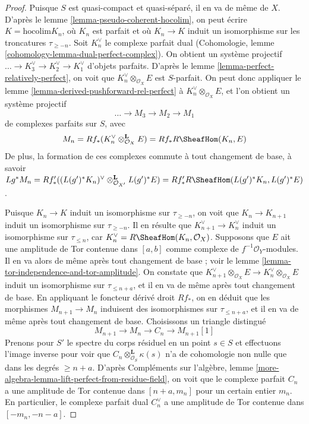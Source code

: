 \begin{proof}
Puisque $S$ est quasi-compact et quasi-séparé, il en va de même de $X$.
D'après le lemme \ref{lemma-pseudo-coherent-hocolim}, on peut écrire
$K = \text{hocolim} K_n$, où $K_n$ est parfait et où $K_n \to K$ induit
un isomorphisme sur les troncatures $\tau_{\geq -n}$. Soit $K_n^\vee$
le complexe parfait dual
(Cohomologie, lemme \ref{cohomology-lemma-dual-perfect-complex}).
On obtient un système projectif $\ldots \to K_3^\vee \to K_2^\vee \to K_1^\vee$
d'objets parfaits. D'après le lemme \ref{lemma-perfect-relatively-perfect},
on voit que $K_n^\vee \otimes_{\mathcal{O}_X} E$ est $S$-parfait.
On peut donc appliquer le lemme \ref{lemma-derived-pushforward-rel-perfect}
à $K_n^\vee \otimes_{\mathcal{O}_X} E$, et l'on obtient un système projectif
$$
\ldots \to M_3 \to M_2 \to M_1
$$
de complexes parfaits sur $S$, avec
$$
M_n = Rf_*(K_n^\vee \otimes_{\mathcal{O}_X}^\mathbf{L} E) =
Rf_*R\SheafHom(K_n, E)
$$
De plus, la formation de ces complexes commute à tout
changement de base, à savoir $Lg^*M_n =
Rf'_*((L(g')^*K_n)^\vee \otimes_{\mathcal{O}_{X'}}^\mathbf{L} L(g')^*E) =
Rf'_*R\SheafHom(L(g')^*K_n, L(g')^*E)$.

\medskip\noindent
Puisque $K_n \to K$ induit un isomorphisme sur $\tau_{\geq -n}$, on voit que
$K_n \to K_{n + 1}$ induit un isomorphisme sur $\tau_{\geq -n}$.
Il en résulte que $K_{n + 1}^\vee \to K_n^\vee$
induit un isomorphisme sur $\tau_{\leq n}$, car
$K_n^\vee = R\SheafHom(K_n, \mathcal{O}_X)$.
Supposons que $E$ ait une amplitude de Tor contenue dans $[a, b]$ comme complexe
de $f^{-1}\mathcal{O}_Y$-modules. Il en va alors de même après
tout changement de base ; voir le lemme \ref{lemma-tor-independence-and-tor-amplitude}.
On constate que
$K_{n + 1}^\vee \otimes_{\mathcal{O}_X} E \to
K_n^\vee \otimes_{\mathcal{O}_X} E$
induit un isomorphisme sur $\tau_{\leq n + a}$,
et il en va de même après tout changement de base.
En appliquant le foncteur dérivé droit $Rf_*$,
on en déduit que les morphismes $M_{n + 1} \to M_n$
induisent des isomorphismes sur $\tau_{\leq n + a}$,
et il en va de même après tout changement de base.
Choisissons un triangle distingué
$$
M_{n + 1} \to M_n \to C_n \to M_{n + 1}[1]
$$
Prenons pour $S'$ le spectre du corps résiduel en un point
$s \in S$ et effectuons l'image inverse pour voir que
$C_n \otimes_{\mathcal{O}_S}^\mathbf{L} \kappa(s)$
n'a de cohomologie non nulle que dans les degrés $\geq n + a$. D'après
Compléments sur l'algèbre, lemme
\ref{more-algebra-lemma-lift-perfect-from-residue-field},
on voit que le complexe parfait $C_n$ a une amplitude de Tor contenue dans
$[n + a, m_n]$ pour un certain entier $m_n$.
En particulier, le complexe parfait dual $C_n^\vee$ a une amplitude de Tor contenue dans
$[-m_n, -n - a]$.


\end{proof}
